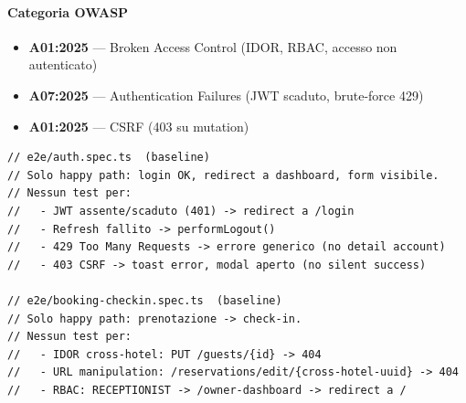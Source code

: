 ﻿\documentclass[a4paper,12pt]{report}
\begin{document}
\paragraph{Categoria OWASP}
\begin{itemize}
  \item \textbf{A01:2025} — Broken Access Control (IDOR, RBAC, accesso non autenticato)
  \item \textbf{A07:2025} — Authentication Failures (JWT scaduto, brute-force 429)
  \item \textbf{A01:2025} — CSRF (403 su mutation)
\end{itemize}

\begin{insecurebox}[title={Baseline --- Suite E2E con zero copertura di percorsi di attacco}]
\begin{lstlisting}[style=typescript]
// e2e/auth.spec.ts  (baseline)
// Solo happy path: login OK, redirect a dashboard, form visibile.
// Nessun test per:
//   - JWT assente/scaduto (401) -> redirect a /login
//   - Refresh fallito -> performLogout()
//   - 429 Too Many Requests -> errore generico (no detail account)
//   - 403 CSRF -> toast error, modal aperto (no silent success)

// e2e/booking-checkin.spec.ts  (baseline)
// Solo happy path: prenotazione -> check-in.
// Nessun test per:
//   - IDOR cross-hotel: PUT /guests/{id} -> 404
//   - URL manipulation: /reservations/edit/{cross-hotel-uuid} -> 404
//   - RBAC: RECEPTIONIST -> /owner-dashboard -> redirect a /
\end{lstlisting}
\end{insecurebox}
\end{document}

